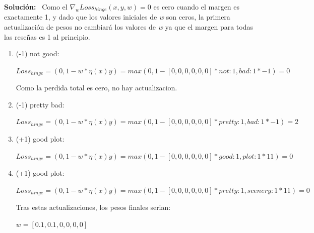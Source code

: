 \documentclass[11pt,letterpaper]{article}
\newenvironment{solution}{%
  \noindent\begin{shaded}
  \textbf{Solución:}\ }{
  \end{shaded}%
}
\begin{document}
\begin{solution}
Como el \begin{math}
     \nabla_w Loss_{hinge}(x,y,w) = 0
\end{math}
es cero cuando el margen es exactamente 1, y dado que los valores iniciales de \textit{w} son ceros, la primera actualización de pesos no cambiará los valores de \textit{w} ya que el margen para todas las reseñas es 1 al principio.

\begin{enumerate}
    \item (-1) not good:
    
        \begin{math}
            Loss_{hinge}=(0,1-w*\eta(x)y) = max(0,1-[0,0,0,0,0,0]*{not : 1, bad : 1}*-1)=0
         \end{math}
    
    Como la perdida total es cero, no hay actualizacion.

    \item (-1) pretty bad:
        
        \begin{math}
            Loss_{hinge}=(0,1-w*\eta(x)y) = max(0,1-[0,0,0,0,0,0]*{pretty : 1, bad : 1}*-1)=2
         \end{math}

    \item (+1) good plot:

        \begin{math}
            Loss_{hinge}=(0,1-w*\eta(x)y) = max(0,1-[0,0,0,0,0,0]*{good : 1, plot : 1}*11)=0
         \end{math}

    \item (+1) good plot:

        \begin{math}
            Loss_{hinge}=(0,1-w*\eta(x)y) = max(0,1-[0,0,0,0,0,0]*{pretty : 1, scenery : 1}*11)=0
         \end{math}

    Tras estas actualizaciones, los pesos finales serian:

    \begin{math}
        w=[0.1,0.1,0,0,0,0]
    \end{math}
\end{enumerate}

\end{solution}

\end{document}

